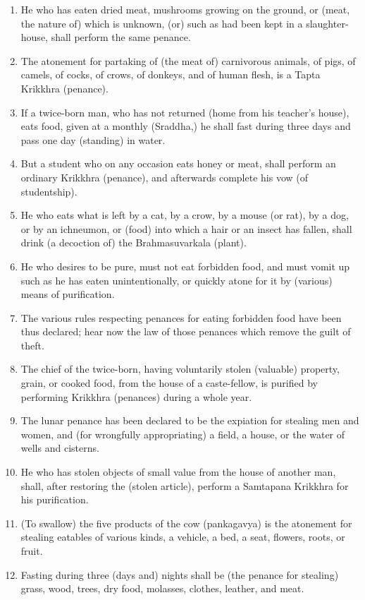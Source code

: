 \begin{enumerate}
\item He who has eaten dried meat, mushrooms growing on the ground, or (meat, the nature of) which is unknown, (or) such as had been kept in a slaughter-house, shall perform the same penance.
\item The atonement for partaking of (the meat of) carnivorous animals, of pigs, of camels, of cocks, of crows, of donkeys, and of human flesh, is a Tapta Krikkhra (penance).
\item If a twice-born man, who has not returned (home from his teacher's house), eats food, given at a monthly (Sraddha,) he shall fast during three days and pass one day (standing) in water.
\item But a student who on any occasion eats honey or meat, shall perform an ordinary Krikkhra (penance), and afterwards complete his vow (of studentship).
\item He who eats what is left by a cat, by a crow, by a mouse (or rat), by a dog, or by an ichneumon, or (food) into which a hair or an insect has fallen, shall drink (a decoction of) the Brahmasuvarkala (plant).
\item He who desires to be pure, must not eat forbidden food, and must vomit up such as he has eaten unintentionally, or quickly atone for it by (various) means of purification.
\item The various rules respecting penances for eating forbidden food have been thus declared; hear now the law of those penances which remove the guilt of theft.
\item The chief of the twice-born, having voluntarily stolen (valuable) property, grain, or cooked food, from the house of a caste-fellow, is purified by performing Krikkhra (penances) during a whole year.
\item The lunar penance has been declared to be the expiation for stealing men and women, and (for wrongfully appropriating) a field, a house, or the water of wells and cisterns.
\item He who has stolen objects of small value from the house of another man, shall, after restoring the (stolen article), perform a Samtapana Krikkhra for his purification.
\item (To swallow) the five products of the cow (pankagavya) is the atonement for stealing eatables of various kinds, a vehicle, a bed, a seat, flowers, roots, or fruit.
\item Fasting during three (days and) nights shall be (the penance for stealing) grass, wood, trees, dry food, molasses, clothes, leather, and meat.

\end{enumerate}
